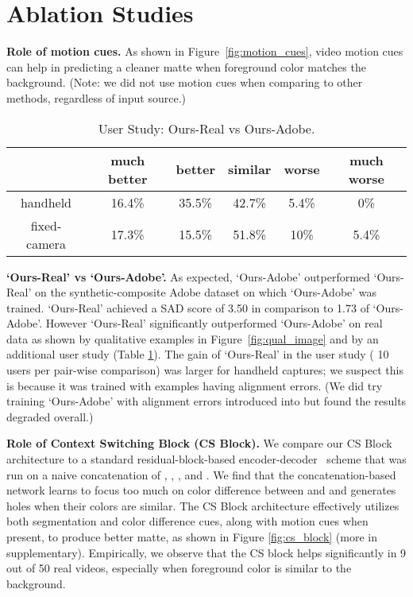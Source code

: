 \documentclass[10pt,twocolumn,letterpaper]{article}
\begin{document}
 \vspace{-0.5em}
\section{Ablation Studies}
\label{sec:abla}
\textbf{Role of motion cues.} As shown in Figure~\ref{fig:motion_cues}, video motion cues   can help in predicting a cleaner matte when foreground color matches the background.  (Note:  we did not use motion cues when comparing to other methods, regardless of input source.)
\begin{table}[!h]
\setlength\tabcolsep{2pt}
	\centering
	\small
	\captionsetup{justification=centering}
    	\vspace{-.5em}
		\begin{tabular}{c|ccccc}
			\toprule
			  &  much better & better & similar & worse & much worse \\ 
			 \midrule
			 handheld & 16.4\% & 35.5\% & 42.7\% & 5.4\% & 0\%\\
			 fixed-camera & 17.3\% & 15.5\% & 51.8\% & 10\% & 5.4\%\\
			\bottomrule
		\end{tabular}
		\vspace{-.5em}
		\caption{\small User Study: Ours-Real vs Ours-Adobe.}
	\vspace{-.5em}
	\label{tab:syn-real}
\end{table}

\textbf{`Ours-Real' vs `Ours-Adobe'.} As expected, `Ours-Adobe' outperformed `Ours-Real' on the synthetic-composite Adobe dataset on which `Ours-Adobe' was trained. `Ours-Real' achieved a SAD score of 3.50 in comparison to 1.73 of `Ours-Adobe'. However `Ours-Real' significantly outperformed `Ours-Adobe' on real data as shown by qualitative examples in Figure~\ref{fig:qual_image} and by an additional user study (Table \ref{tab:syn-real}).  The gain of `Ours-Real' in the user study ( 10 users per pair-wise comparison) was larger for handheld captures; we suspect this is because it was trained with examples having alignment errors.  (We did try training `Ours-Adobe' with alignment errors introduced into  but found the results degraded overall.) 



\textbf{Role of Context Switching Block (CS Block).} We compare our CS Block architecture to a standard residual-block-based encoder-decoder~\cite{zhu2017unpaired} scheme that was run on a naive concatenation of , , , and .  We find that the concatenation-based network learns to focus too much on color difference between  and  and generates holes when their colors are similar.  The CS Block architecture effectively utilizes both segmentation and color difference cues, along with motion cues when present, to produce better matte, as shown in Figure \ref{fig:cs_block} (more in supplementary). Empirically, we observe that the CS block helps significantly in 9 out of 50 real videos, especially when foreground color is similar to the background.
\end{document}
